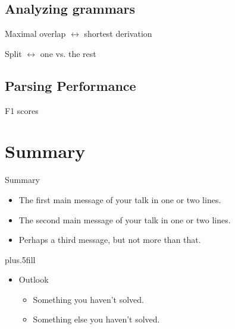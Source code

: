 \documentclass{beamer}
\begin{document}
\subsection{Analyzing grammars}

\begin{frame}{Maximal overlap $\leftrightarrow$ shortest derivation}
\end{frame}

\begin{frame}{Split $\leftrightarrow$ one vs. the rest}
\end{frame}

\subsection{Parsing Performance}
\begin{frame}{F1 scores}
\end{frame}


\section*{Summary}

\begin{frame}{Summary}

  \begin{itemize}
  \item
    The \alert{first main message} of your talk in one or two lines.
  \item
    The \alert{second main message} of your talk in one or two lines.
  \item
    Perhaps a \alert{third message}, but not more than that.
  \end{itemize}
  
  \vskip0pt plus.5fill
  \begin{itemize}
  \item
    Outlook
    \begin{itemize}
    \item
      Something you haven't solved.
    \item
      Something else you haven't solved.
    \end{itemize}
  \end{itemize}
\end{frame}





%
%
%
%    
%    
\end{document}
